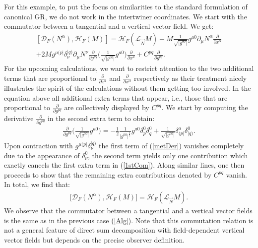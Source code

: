 For this example, to put the focus on similarities to the standard formulation of canonical GR, we do not work in the intertwiner coordinates. We start with the commutator between a  tangential and a vertical vector field.
We get:
\begin{multline}\label{1stCom}
    \left[ \mathcal{D}_F(N^{\alpha}) , \mathcal{H}_F(M) \right] = \mathcal{H}_F(\mathcal{L}_{\vec{N}}M) - M \frac{1}{\sqrt{\vert g^{00} \vert }} g^{\mu0} \partial_{\mu} N^{\alpha} \frac{\partial}{\partial x^{\alpha}} \\
    +2M g^{\mu (p\vert} \delta^{\vert q)}_{\nu} \partial_{\mu} N^{\nu} \frac{\partial}{\partial g ^{pq}} \biggl(\frac{1}{\sqrt{\vert g^{00} \vert }} g^{a0} \biggr) \frac{\partial}{\partial x^a} + C^{pq} \frac{\partial}{\partial g^{pq}}.
\end{multline}
For the upcoming calculations, we want to restrict attention to the two additional terms that are proportional to $\frac{\partial}{\partial x^a}$ and $\frac{\partial}{\partial x^{\alpha}}$ respectively as their treatment nicely illustrates the spirit of the calculations without them getting too involved. In the equation above all additional extra terms that appear, i.e., those that are proportional to $\frac{\partial}{\partial g^{pq}}$ are collectively displayed by $C^{pq}$. We start by computing the derivative $\frac{\partial}{\partial g^{pq}}$ in the second extra term to obtain:
\begin{align}\label{metDer}
    \frac{\partial}{\partial g ^{pq}} \biggl (\frac{1}{\sqrt{\vert g^{00} \vert }} g^{a0} \biggr) = -\frac{1}{2} \frac{1}{\vert g^{00} \vert^{\frac{3}{2}}} g^{a0} \delta^0_p \delta^0_q +  \frac{1}{\sqrt{\vert g^{00} \vert }} \delta^a_{(p \vert} \delta^0 _{\vert q)}. 
\end{align}
Upon contraction with $g^{\mu ( p \vert} \delta ^{\vert q)}_{\nu}$ the first term of (\ref{metDer}) vanishes completely due to the appearance of $\delta^0_{\nu}$, the second term yields only one contribution which exactly cancels the first extra term in (\ref{1stCom}). Along similar lines, one then proceeds to show that the remaining extra contributions denoted by $C^{pq}$ vanish. In total, we find that:
\begin{align}\label{FDH}
    \bigl[ \mathcal{D}_F(N^{\alpha}) , \mathcal{H}_F(M) \bigr] = \mathcal{H}_F(\mathcal{L}_{\vec{N}}M).
\end{align}
We observe that the commutator between a tangential and a vertical vector fields is the same as in the previous case (\ref{Alg}).
Note that this commutation relation is not a general feature of direct sum decomposition with field-dependent vertical vector fields but depends on the precise observer definition. 

